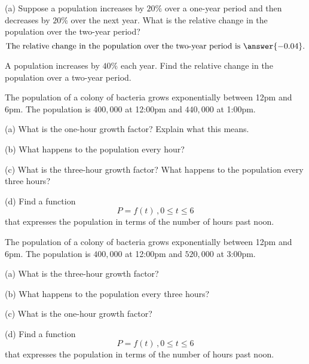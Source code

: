 \documentclass{ximera}
\begin{document}
\begin{question}  \label{Q2:ExponentialG}
(a) Suppose a population increases by $20\%$ over a one-year period and then decreases by $20\%$ over the next year. What is the relative change in the population over the two-year period?
\[
   \text{The relative change in the population over the two-year period is }   \answer{-0.04} .
\]

\end{question}

\begin{question}  \label{Q3:ExponentialG}
A population increases by $40\%$ each year. Find the relative change in the population over a two-year period. 
\begin{multipleChoice}  
\end{multipleChoice}  
\end{question}


\begin{question}   \label{Q4:ExponentialG}
The population of a colony of bacteria grows exponentially between 12pm and 6pm. The population is $400,000$ at 12:00pm and $440,000$ at 1:00pm. 

(a) What is the one-hour growth factor? Explain what this means.

(b) What happens to the population every hour?

(c) What is the three-hour growth factor? What happens to the population every three hours?

(d) Find a function 
\[
     P = f(t) \, , 0\leq t \leq 6 
\]
that expresses the population in terms of the number of hours past noon.

\end{question}


\begin{question}   \label{Q5:ExponentialG}
The population of a colony of bacteria grows exponentially between 12pm and 6pm. The population is $400,000$ at 12:00pm and $520,000$ at 3:00pm. 

(a) What is the three-hour growth factor?

(b) What happens to the population every three hours?

(c) What is the one-hour growth factor?

(d) Find a function 
\[
     P = f(t) \, , 0\leq t \leq 6 
\]
that expresses the population in terms of the number of hours past noon.

\end{question}
\end{document}
